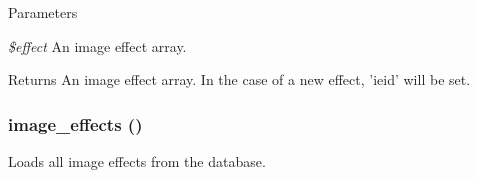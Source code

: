 \begin{DoxyParams}{Parameters}
\item[{\em \$effect}]An image effect array.\end{DoxyParams}
\begin{DoxyReturn}{Returns}
An image effect array. In the case of a new effect, 'ieid' will be set. 
\end{DoxyReturn}
\hypertarget{image_8module_ae0237054a43c19118bf13e609e5cff8b}{
\subsubsection[{image\_\-effects}]{\setlength{\rightskip}{0pt plus 5cm}image\_\-effects ()}}
\label{image_8module_ae0237054a43c19118bf13e609e5cff8b}
Loads all image effects from the database.

